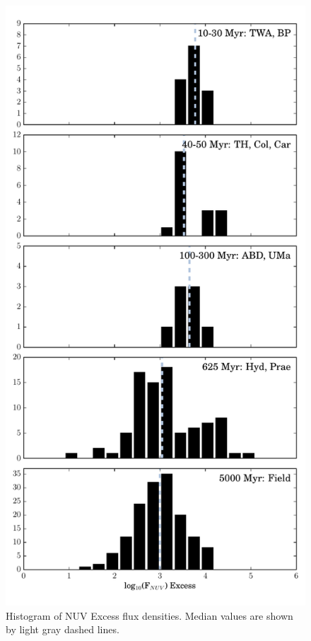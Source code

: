 \documentclass[twocolumn]{aastex62}
\begin{document}
\begin{figure}[t]
\centering
\includegraphics[width=\linewidth]{histfd_NUV.pdf}
\caption{Histogram of NUV Excess flux densities. Median values are shown by light gray dashed lines. \label{fig:histfd_nuv}}
\end{figure}
\end{document}
